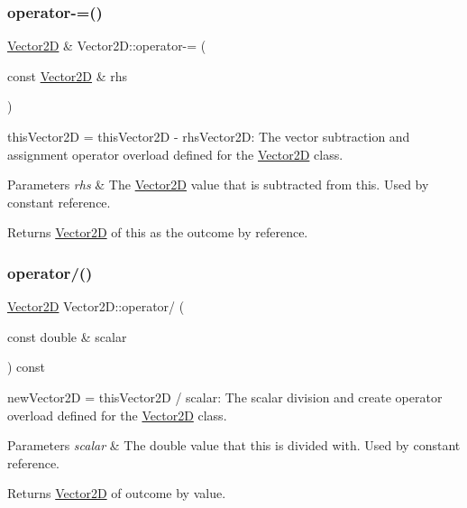 \subsubsection{\texorpdfstring{operator-\/=()}{operator-=()}}
{\footnotesize\ttfamily \hyperlink{class_vector2_d}{Vector2D} \& Vector2\+D\+::operator-\/= (\begin{DoxyParamCaption}\item[{const \hyperlink{class_vector2_d}{Vector2D} \&}]{rhs }\end{DoxyParamCaption})}



this\+Vector2D = this\+Vector2D -\/ rhs\+Vector2D\+: The vector subtraction and assignment operator overload defined for the \hyperlink{class_vector2_d}{Vector2D} class. 


\begin{DoxyParams}{Parameters}
{\em rhs} & The \hyperlink{class_vector2_d}{Vector2D} value that is subtracted from this. Used by constant reference. \\
\hline
\end{DoxyParams}
\begin{DoxyReturn}{Returns}
\hyperlink{class_vector2_d}{Vector2D} of this as the outcome by reference. 
\end{DoxyReturn}
\mbox{\label{class_vector2_d_adc10dc721432ed17e94602640bb24346}} 
\subsubsection{\texorpdfstring{operator/()}{operator/()}}
{\footnotesize\ttfamily \hyperlink{class_vector2_d}{Vector2D} Vector2\+D\+::operator/ (\begin{DoxyParamCaption}\item[{const double \&}]{scalar }\end{DoxyParamCaption}) const}



new\+Vector2D = this\+Vector2D / scalar\+: The scalar division and create operator overload defined for the \hyperlink{class_vector2_d}{Vector2D} class. 


\begin{DoxyParams}{Parameters}
{\em scalar} & The double value that this is divided with. Used by constant reference. \\
\hline
\end{DoxyParams}
\begin{DoxyReturn}{Returns}
\hyperlink{class_vector2_d}{Vector2D} of outcome by value. 
\end{DoxyReturn}
\mbox{\label{class_vector2_d_a72a388dec12b808190830a35be86a1f7}} 
